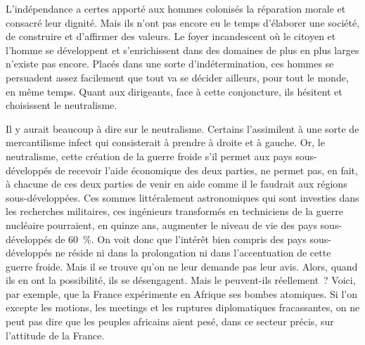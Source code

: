 \documentclass[french,twoside]{book} %
\begin{document}
\bigbreak
\noindent L’indépendance a certes apporté aux hommes colonisés la réparation morale et consacré leur dignité. Mais ils n’ont pas encore eu le temps d’élaborer une société, de construire et d’affirmer des valeurs. Le foyer incandescent où le citoyen et l’homme se développent et s’enrichissent dans des domaines de plus en plus larges n’existe pas encore. Placés dans une sorte d’indétermination, ces hommes se persuadent assez facilement que tout va se décider ailleurs, pour tout le monde, en même temps. Quant aux dirigeants, face à cette conjoncture, ils hésitent et choisissent le neutralisme.\par
\bigbreak
\noindent Il y aurait beaucoup à dire sur le neutralisme. Certains l’assimilent à une sorte de mercantilisme infect qui consisterait à prendre à droite et à gauche. Or, le neutralisme, cette création de la guerre froide s’il permet aux pays sous-développés de recevoir l’aide économique des deux parties, ne permet pas, en fait, à chacune de ces deux parties de venir en aide comme il le faudrait aux régions sous-développées. Ces sommes littéralement astronomiques qui sont investies dans les recherches militaires, ces ingénieurs transformés en techniciens de la guerre nucléaire pourraient, en quinze ans, augmenter le niveau de vie des pays sous-développés de 60 \%. On voit donc que l’intérêt bien compris des pays sous-développés ne réside ni dans la prolongation ni dans l’accentuation de cette guerre froide. Mais il se trouve qu’on ne leur demande pas leur avis. Alors, quand ils en ont la possibilité, ils se désengagent. Mais le peuvent-ils réellement ? Voici, par exemple, que la France expérimente en Afrique ses   bombes atomiques. Si l’on excepte les motions, les meetings et les ruptures diplomatiques fracassantes, on ne peut pas dire que les peuples africains aient pesé, dans ce secteur précis, sur l’attitude de la France.\par
\bigbreak
\end{document}
